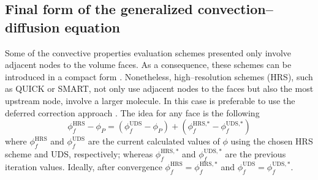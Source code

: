 
\subsection{Final form of the generalized convection--diffusion equation}

Some of the convective properties evaluation schemes presented only involve adjacent nodes to the volume faces. As a consequence, these schemes can be introduced in a compact form \cite{patankar2008numerical}. Nonetheless, high--resolution schemes (HRS), such as QUICK or SMART, not only use adjacent nodes to the faces but also the most upstream node, \ie involve a larger molecule. In this case is preferable to use the deferred correction approach \cite{cttc_cde_2021}. The idea for any face is the following
\begin{equation}
	\phi_f^\text{HRS} - \phi_P = 
	\left( \phi_f^\text{UDS} - \phi_P \right) + 
	\left( \phi_f^{\text{HRS,}\ast} - \phi_f^{\text{UDS,}\ast} \right)
\end{equation}
where $\phi_f^\text{HRS}$ and $\phi_f^\text{UDS}$ are the current calculated values of $\phi$ using the chosen HRS scheme and UDS, respectively; whereas $\phi_f^{\text{HRS},\ast}$ and $\phi_f^{\text{UDS},\ast}$ are the previous iteration values. Ideally, after convergence $\phi_f^\text{HRS} = \phi_f^{\text{HRS},\ast}$ and $\phi_f^\text{UDS} = \phi_f^{\text{UDS},\ast}$.


\cite{cfd_online_schemes}

